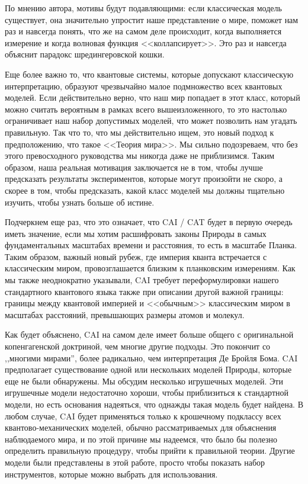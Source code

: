 \documentclass[main.tex]{subfiles}
\begin{document}
По мнению автора, мотивы будут подавляющими: если классическая модель существует, она значительно упростит наше представление о мире, поможет нам раз и навсегда понять, что же на самом деле происходит, когда выполняется измерение и когда волновая функция <<коллапсирует>>. Это раз и навсегда объяснит парадокс шредингеровской кошки.

Еще более важно то, что квантовые системы, которые допускают классическую интерпретацию, образуют чрезвычайно малое подмножество всех квантовых моделей. Если действительно верно, что наш мир попадает в этот класс, который можно считать вероятным в рамках всего вышеизложенного, то это настолько ограничивает наш набор допустимых моделей, что может позволить нам угадать правильную. Так что то, что мы действительно ищем, это новый подход к предположению, что такое <<Теория мира>>. Мы сильно подозреваем, что без этого превосходного руководства мы никогда даже не приблизимся. Таким образом, наша реальная мотивация заключается не в том, чтобы лучше предсказать результаты экспериментов, которые могут произойти не скоро, а скорее в том, чтобы предсказать, какой класс моделей мы должны тщательно изучить, чтобы узнать больше об истине.

Подчеркнем еще раз, что это означает, что CAI / CAT будет в первую очередь иметь значение, если мы хотим расшифровать законы Природы в самых фундаментальных масштабах времени и расстояния, то есть в масштабе Планка. Таким образом, важный новый рубеж, где империя кванта встречается с классическим миром, провозглашается близким к планковским измерениям. Как мы также неоднократно указывали, CAI требует переформулировки нашего стандартного квантового языка также при описании другой важной границы: границы между квантовой империей и <<обычным>> классическим миром в масштабах расстояний, превышающих размеры атомов и молекул.

Как будет объяснено, CAI на самом деле имеет больше общего с оригинальной копенгагенской доктриной, чем многие другие подходы. Это покончит со ,,многими мирами'', более радикально, чем интерпретация Де Бройля Бома. CAI предполагает существование одной или нескольких моделей Природы, которые еще не были обнаружены. Мы обсудим несколько игрушечных моделей. Эти игрушечные модели недостаточно хороши, чтобы приблизиться к стандартной модели, но есть основания надеяться, что однажды такая модель будет найдена. В любом случае, CAI будет применяться только к крошечному подклассу всех квантово-механических моделей, обычно рассматриваемых для объяснения наблюдаемого мира, и по этой причине мы надеемся, что было бы полезно определить правильную процедуру, чтобы прийти к правильной теории.
Другие модели были представлены в этой работе, просто чтобы показать набор инструментов, которые можно выбрать для использования.
\end{document}
